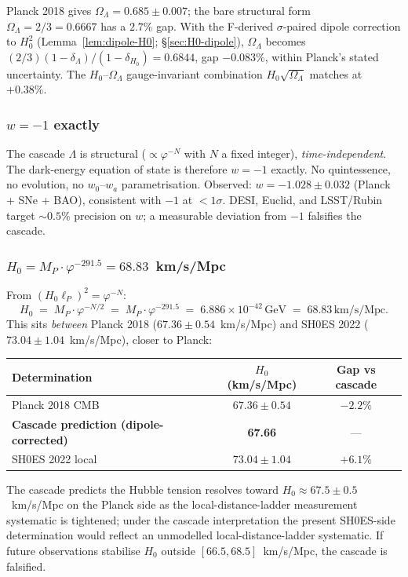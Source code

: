 \documentclass[11pt]{article}
\theoremstyle{plain}
\theoremstyle{definition}
\theoremstyle{remark}
\begin{document}
Planck 2018 gives $\Omega_\Lambda = 0.685 \pm 0.007$; the bare structural form $\Omega_\Lambda = 2/3 = 0.6667$ has a $2.7\%$ gap. With the F-derived $\sigma$-paired dipole correction to $H_0^2$ (Lemma~\ref{lem:dipole-H0}; \S\ref{sec:H0-dipole}), $\Omega_\Lambda$ becomes $(2/3)(1-\delta_\Lambda)/(1-\delta_{H_0}) = 0.6844$, gap $-0.083\%$, within Planck's stated uncertainty. The $H_0$--$\Omega_\Lambda$ gauge-invariant combination $H_0\sqrt{\Omega_\Lambda}$ matches at $+0.38\%$.

\subsubsection{$w = -1$ exactly}

The cascade $\Lambda$ is structural ($\propto \varphi^{-N}$ with $N$ a fixed integer), \emph{time-independent}. The dark-energy equation of state is therefore $w = -1$ exactly. No quintessence, no evolution, no $w_0$--$w_a$ parametrisation. Observed: $w = -1.028 \pm 0.032$ (Planck + SNe + BAO), consistent with $-1$ at $< 1\sigma$. DESI, Euclid, and LSST/Rubin target $\sim 0.5\%$ precision on $w$; a measurable deviation from $-1$ falsifies the cascade.

\subsubsection{$H_0 = M_P \cdot \varphi^{-291.5} = 68.83$~km/s/Mpc}

From $(H_0 \ell_P)^2 = \varphi^{-N}$:
\[
  H_0 \;=\; M_P \cdot \varphi^{-N/2} \;=\; M_P \cdot \varphi^{-291.5} \;=\; 6.886 \times 10^{-42}\,\mathrm{GeV} \;=\; 68.83\,\text{km/s/Mpc}.
\]
This sits \emph{between} Planck 2018 ($67.36 \pm 0.54$~km/s/Mpc) and SH0ES 2022 ($73.04 \pm 1.04$~km/s/Mpc), closer to Planck:
\begin{center}
\begin{tabular}{lcc}
\toprule
Determination & $H_0$ (km/s/Mpc) & Gap vs cascade \\
\midrule
Planck 2018 CMB & $67.36 \pm 0.54$ & $-2.2\%$ \\
\textbf{Cascade prediction (dipole-corrected)} & \textbf{67.66} & --- \\
SH0ES 2022 local & $73.04 \pm 1.04$ & $+6.1\%$ \\
\bottomrule
\end{tabular}
\end{center}

The cascade predicts the Hubble tension resolves toward $H_0 \approx 67.5 \pm 0.5$~km/s/Mpc on the Planck side as the local-distance-ladder measurement systematic is tightened; under the cascade interpretation the present SH0ES-side determination would reflect an unmodelled local-distance-ladder systematic. If future observations stabilise $H_0$ outside $[66.5, 68.5]$~km/s/Mpc, the cascade is falsified.
\end{document}
